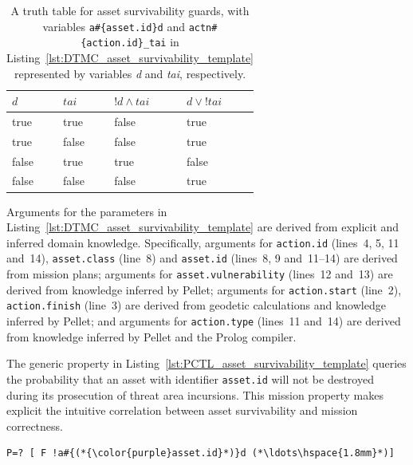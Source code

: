 \begin{table}[ht]
	\renewcommand*\arraystretch{1.3}
	\begin{tabularx}{\textwidth}{
			>{\centering\arraybackslash}X|
			>{\centering\arraybackslash}X|
			>{\centering\arraybackslash}X|
			>{\centering\arraybackslash}X
		}
		$d$ & $tai$ & $!d \wedge tai$ & $d \vee !tai$\\
		\hline
		true & true & false & \cellcolor{green!65}true\\
		\hline
		true & false & false & \cellcolor{green!65}true\\
		\hline
		false & true & \cellcolor{green!65}true & false\\
		\hline
		false & false & false & \cellcolor{green!65}true\\
	\end{tabularx}
	\caption[Asset survivability truth table]{A truth table for asset survivability guards, with variables \texttt{a\#\{asset.id\}d} and \texttt{actn\#\{action.id\}\_tai} in Listing~\ref{lst:DTMC_asset_survivability_template} represented by variables \emph{d} and \emph{tai}, respectively.}
	\label{tab:asset_survivability_module_truth_table}
\end{table}

Arguments for the parameters in Listing~\ref{lst:DTMC_asset_survivability_template} are derived from explicit and inferred domain knowledge. Specifically, arguments for \texttt{action.id} (lines~4, 5, 11 and~14), \texttt{asset.class} (line~8) and \texttt{asset.id} (lines~8, 9 and~11--14) are derived from mission plans; arguments for \texttt{asset.vulnerability} (lines~12 and~13) are derived from knowledge inferred by Pellet; arguments for \texttt{action.start} (line~2), \texttt{action.finish} (line~3) are derived from geodetic calculations and knowledge inferred by Pellet; and arguments for \texttt{action.type} (lines~11 and~14) are derived from knowledge inferred by Pellet and the Prolog compiler.

The generic property in Listing~\ref{lst:PCTL_asset_survivability_template} queries the probability that an asset with identifier \texttt{asset.id} will not be destroyed during its prosecution of threat area incursions. This mission property makes explicit the intuitive correlation between asset survivability and mission correctness.

\begin{lstlisting}[caption={PCTL template for asset survivability},label=lst:PCTL_asset_survivability_template]
P=? [ F !a#{(*{\color{purple}asset.id}*)}d (*\ldots\hspace{1.8mm}*)]
\end{lstlisting}

